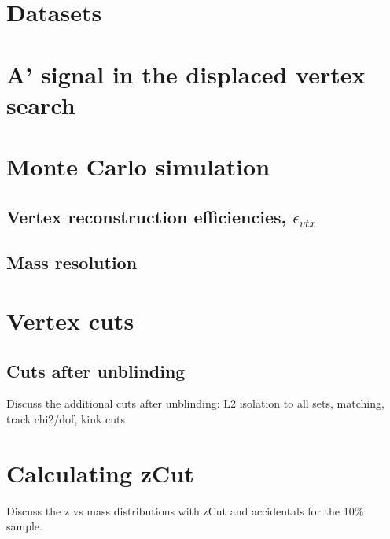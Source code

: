 \documentclass[12pt]{report}
\begin{document}
\section{Datasets}


\section{A' signal in the displaced vertex search}


\section{Monte Carlo simulation}


\subsection{Vertex reconstruction efficiencies, $\epsilon_{vtx}$}


\subsection{Mass resolution}



\section{Vertex cuts}

\subsection{Cuts after unblinding}
Discuss the additional cuts after unblinding: L2 isolation to all sets, matching, track chi2/dof, kink cuts
%
%

\section{Calculating zCut}
Discuss the z vs mass distributions with zCut and accidentals for the 10$\%$ sample.
\end{document}

